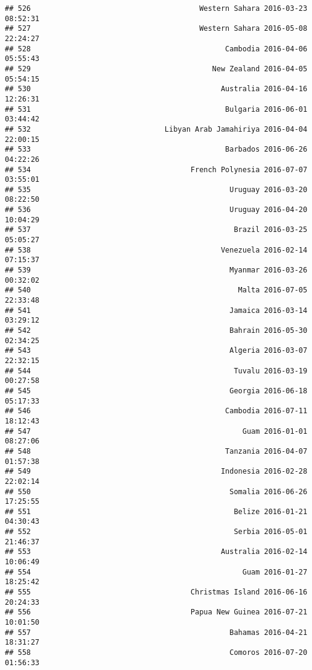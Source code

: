 \documentclass[
]{article}
\begin{document}
\begin{verbatim}
## 526                                       Western Sahara 2016-03-23 08:52:31
## 527                                       Western Sahara 2016-05-08 22:24:27
## 528                                             Cambodia 2016-04-06 05:55:43
## 529                                          New Zealand 2016-04-05 05:54:15
## 530                                            Australia 2016-04-16 12:26:31
## 531                                             Bulgaria 2016-06-01 03:44:42
## 532                               Libyan Arab Jamahiriya 2016-04-04 22:00:15
## 533                                             Barbados 2016-06-26 04:22:26
## 534                                     French Polynesia 2016-07-07 03:55:01
## 535                                              Uruguay 2016-03-20 08:22:50
## 536                                              Uruguay 2016-04-20 10:04:29
## 537                                               Brazil 2016-03-25 05:05:27
## 538                                            Venezuela 2016-02-14 07:15:37
## 539                                              Myanmar 2016-03-26 00:32:02
## 540                                                Malta 2016-07-05 22:33:48
## 541                                              Jamaica 2016-03-14 03:29:12
## 542                                              Bahrain 2016-05-30 02:34:25
## 543                                              Algeria 2016-03-07 22:32:15
## 544                                               Tuvalu 2016-03-19 00:27:58
## 545                                              Georgia 2016-06-18 05:17:33
## 546                                             Cambodia 2016-07-11 18:12:43
## 547                                                 Guam 2016-01-01 08:27:06
## 548                                             Tanzania 2016-04-07 01:57:38
## 549                                            Indonesia 2016-02-28 22:02:14
## 550                                              Somalia 2016-06-26 17:25:55
## 551                                               Belize 2016-01-21 04:30:43
## 552                                               Serbia 2016-05-01 21:46:37
## 553                                            Australia 2016-02-14 10:06:49
## 554                                                 Guam 2016-01-27 18:25:42
## 555                                     Christmas Island 2016-06-16 20:24:33
## 556                                     Papua New Guinea 2016-07-21 10:01:50
## 557                                              Bahamas 2016-04-21 18:31:27
## 558                                              Comoros 2016-07-20 01:56:33

\end{verbatim}
\end{document}
